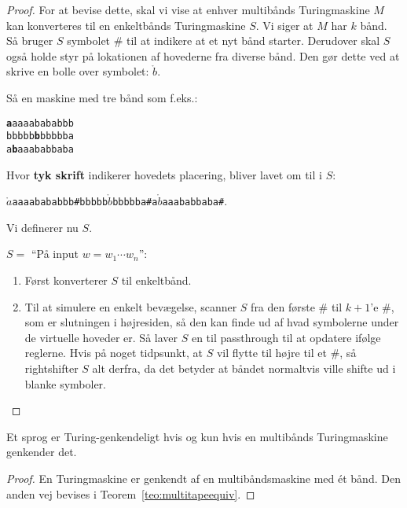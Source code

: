 \begin{proof}
For at bevise dette, skal vi vise at enhver multibånds Turingmaskine $M$ kan konverteres til en enkeltbånds Turingmaskine $S$. Vi siger at $M$ har $k$ bånd. Så bruger $S$ symbolet \# til at indikere at et nyt bånd starter. Derudover skal $S$ også holde styr på lokationen af hovederne fra diverse bånd. Den gør dette ved at skrive en bolle over symbolet: $\mathring{b}$.

Så en maskine med tre bånd som f.eks.:\\
\begin{center}
\noindent
\texttt{\textbf{a}aaaabababbb}\\
\noindent
\texttt{bbbbb\textbf{b}bbbbba}\\
\noindent
\texttt{a\textbf{b}aaababbaba}\\
\end{center}
Hvor \textbf{tyk skrift} indikerer hovedets placering, bliver lavet om til i $S$:
\begin{center}
\texttt{$\mathring{a}$aaaabababbb\#bbbbb$\mathring{b}$bbbbba\#a$\mathring{b}$aaababbaba\#}.
\end{center}

Vi definerer nu $S$.

$S = $ ``På input $w = w_{1} \cdots w_{n}$'':
\begin{enumerate}
  \item Først konverterer $S$ til enkeltbånd.
  \item Til at simulere en enkelt bevægelse, scanner $S$ fra den første \# til $k+1$'e \#, som er slutningen i højresiden, så den kan finde ud af hvad symbolerne under de virtuelle hoveder er. Så laver $S$ en til passthrough til at opdatere ifølge reglerne. Hvis på noget tidpsunkt, at $S$ vil flytte til højre til et $\#$, så rightshifter $S$ alt derfra, da det betyder at båndet normaltvis ville shifte ud i blanke symboler.
\end{enumerate}

\end{proof}

\begin{corollary}
Et sprog er Turing-genkendeligt hvis og kun hvis en multibånds Turingmaskine genkender det.
\end{corollary}

\begin{proof}
En Turingmaskine er genkendt af en multibåndsmaskine med ét bånd. Den anden vej bevises i Teorem~\ref{teo:multitapeequiv}.
\end{proof}


